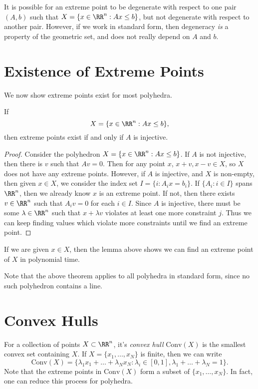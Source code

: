 It is possible for an extreme point to be degenerate with respect to one pair $(A,b)$ such that $X = \{ x \in \RR^n: Ax \leq b \}$, but not degenerate with respect to another pair. However, if we work in standard form, then degeneracy \emph{is} a property of the geometric set, and does not really depend on $A$ and $b$.

\section{Existence of Extreme Points}

We now show extreme points exist for most polyhedra.

\begin{lemma}
    If
    \[ X = \{ x \in \RR^n: Ax \leq b \}, \]
    then extreme points exist if and only if $A$ is injective.
\end{lemma}
\begin{proof}
    Consider the polyhedron $X = \{ x \in \RR^n : Ax \leq b \}$. If $A$ is not injective, then there is $v$ such that $Av = 0$. Then for any point $x$, $x + v, x - v \in X$, so $X$ does not have any extreme points. However, if $A$ is injective, and $X$ is non-empty, then given $x \in X$, we consider the index set $I = \{ i : A_ix = b_i \}$. If $\{ A_i : i \in I \}$ spans $\RR^n$, then we already know $x$ is an extreme point. If not, then there exists $v \in \RR^n$ such that $A_i v = 0$ for each $i \in I$. Since $A$ is injective, there must be some $\lambda \in \RR^n$ such that $x + \lambda v$ violates at least one more constraint $j$. Thus we can keep finding values which violate more constraints until we find an extreme point.
\end{proof}

\begin{remark}
    If we are given $x \in X$, then the lemma above shows we can find an extreme point of $X$ in polynomial time.
\end{remark}

Note that the above theorem applies to all polyhedra in standard form, since no such polyhedron contains a line.

\section{Convex Hulls}

For a collection of points $X \subset \RR^n$, it's \emph{convex hull} $\text{Conv}(X)$ is the smallest convex set containing $X$. If $X = \{ x_1, \dots, x_N \}$ is finite, then we can write
%
\[ \text{Conv}(X) = \{ \lambda_1 x_1 + \dots + \lambda_N x_N: \lambda_i \in [0,1], \lambda_1 + \dots + \lambda_N = 1 \}. \]
%
Note that the extreme points in $\text{Conv}(X)$ form a subset of $\{ x_1, \dots, x_N \}$. In fact, one can reduce this process for polyhedra.

